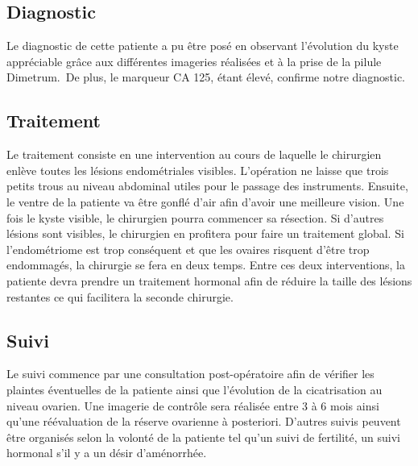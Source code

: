 \subsection{Diagnostic}
Le diagnostic de cette patiente a pu être posé en observant l’évolution du kyste appréciable grâce aux différentes imageries réalisées et à la prise de la pilule Dimetrum\textregistered.\, De plus, le marqueur CA 125, étant élevé, confirme notre diagnostic.

\subsection{Traitement}
Le traitement consiste en une intervention au cours de laquelle le chirurgien enlève toutes les lésions endométriales visibles. L’opération ne laisse que trois petits trous au niveau abdominal utiles pour le passage des instruments. Ensuite, le ventre de la patiente va être gonflé d’air afin d’avoir une meilleure vision. Une fois le kyste visible, le chirurgien pourra commencer sa résection. Si d’autres lésions sont visibles, le chirurgien en profitera pour faire un traitement global. Si l’endométriome est trop conséquent et que les ovaires risquent d’être trop endommagés, la chirurgie se fera en deux temps. Entre ces deux interventions, la patiente devra prendre un traitement hormonal afin de réduire la taille des lésions restantes ce qui facilitera la seconde chirurgie.

\subsection{Suivi}
Le suivi commence par une consultation post-opératoire afin de vérifier les plaintes éventuelles de la patiente ainsi que l’évolution de la cicatrisation au niveau ovarien. Une imagerie de contrôle sera réalisée entre 3 à 6 mois ainsi qu’une réévaluation de la réserve ovarienne à posteriori. D’autres suivis peuvent être organisés selon la volonté de la patiente tel qu’un suivi de fertilité, un suivi hormonal s'il y a un désir d’aménorrhée.